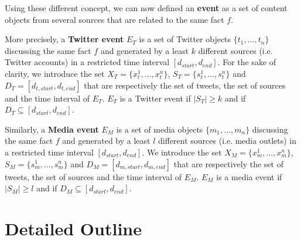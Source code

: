 Using these different concept, we can now defined an \textbf{event} as a set of content objects from several sources that are related to the same fact $f$. 


More precisely, a \textbf{Twitter event} $E_T$ is a set of Twitter objects
$\{t_1,...,t_n\}$  discussing the same fact $f$ and generated by a least $k$ different sources (i.e. Twitter accounts) in a restricted time interval $[d_{start},d_{end}]$. For the sake of clarity, we introduce the set 
$X_T = \{x_t^1, ..., x_t^n\}$, 
$S_T = \{s_t^1, ... ,s_t^n\}$ and 
$D_T = [d_{t,start},d_{t,end}]$ that are respectively the
set of tweets, the set of sources and the time interval of $E_T$. $E_T$ is a Twitter event if $|S_T|  \geq k$ and if  $D_T 
\subseteq [d_{start},d_{end}]$.


Similarly, a \textbf{Media event} $E_M$ is a set of media objects
$\{m_1,...,m_n\}$  discussing the same fact $f$ and generated by a least $l$ different sources (i.e. media outlets) in a restricted time interval $[d_{start},d_{end}]$. We introduce the set 
$X_M = \{x_m^1, ..., x_m^n\}$, 
$S_M = \{s_m^1, ... ,s_m^n\}$ and 
$D_M = [d_{m,start},d_{m,end}]$ that are respectively the
set of tweets, the set of sources and the time interval of $E_M$. $E_M$ is a media event if $|S_M|  \geq l$ and if  $D_M 
\subseteq [d_{start},d_{end}]$.

\section{Detailed Outline}